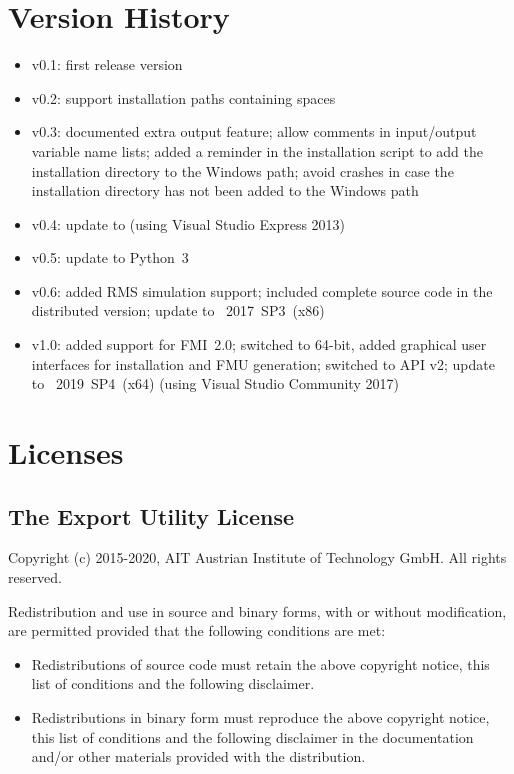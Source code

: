 

\chapter{Version History}

\begin{itemize}
  \item v0.1: first release version
  \item v0.2: support installation paths containing spaces %
  \item v0.3: documented extra output feature; allow comments in input/output variable name lists; added a reminder in the installation script to add the \pf installation directory to the Windows path; avoid crashes in case the \pf installation directory has not been added to the Windows path
  \item v0.4: update to  (using Visual Studio Express 2013)
  \item v0.5: update to Python~3
  \item v0.6: added RMS simulation support; included complete source code in the distributed version; update to \pf~2017~SP3~(x86)
  \item v1.0: added support for FMI~2.0; switched to 64-bit, added graphical user interfaces for installation and FMU generation; switched to \pf API v2; update to \pf~2019~SP4~(x64) (using Visual Studio Community 2017)
\end{itemize}


\chapter{Licenses}

\section{The \fmipp \pf Export Utility License}
\label{pf_fmu_license}

Copyright (c) 2015-2020, AIT Austrian Institute of Technology GmbH. All
rights reserved.

Redistribution and use in source and binary forms, with or without
modification, are permitted provided that the following conditions are
met:

\begin{itemize}
\itemsep1pt\parskip0pt
\item
  Redistributions of source code must retain the above copyright notice,
  this list of conditions and the following disclaimer.
\item
  Redistributions in binary form must reproduce the above copyright
  notice, this list of conditions and the following disclaimer in the
  documentation and/or other materials provided with the distribution.
\end{itemize}

